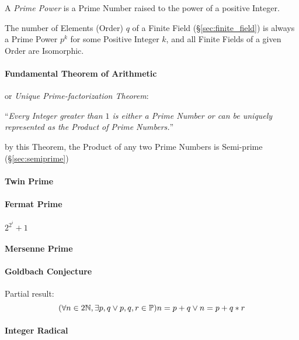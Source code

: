 A \emph{Prime Power} is a Prime Number raised to the power of a
positive Integer.

The number of Elements (Order) $q$ of a Finite Field (\S\ref{sec:finite_field})
is always a Prime Power $p^k$ for some Positive Integer $k$, and all Finite
Fields of a given Order are Isomorphic.



\paragraph{Fundamental Theorem of Arithmetic}
\label{sec:fundamental_arithmetic_theorem}\hfill

or \emph{Unique Prime-factorization Theorem}:

``\emph{Every Integer greater than $1$ is either a Prime Number or can be
  uniquely represented as the Product of Prime Numbers.}''

by this Theorem, the Product of any two Prime Numbers is Semi-prime
(\S\ref{sec:semiprime})



\paragraph{Twin Prime}\label{sec:twin_prime}\hfill

\paragraph{Fermat Prime}\label{sec:fermat_prime}\hfill

$2^{2^i} + 1$



\paragraph{Mersenne Prime}\label{sec:mersenne_prime}\hfill

\paragraph{Goldbach Conjecture}\label{sec:goldbach_conjecture}\hfill

Partial result:
\[
  (\forall n \in 2\mathbb{N}, \exists p,q \vee p,q,r \in \mathbb{P})
  n = p + q \vee n = p + q * r
\]



\paragraph{Integer Radical}\label{sec:integer_radical}\hfill

